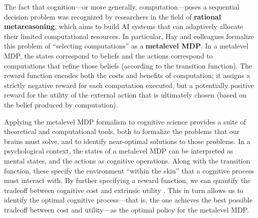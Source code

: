 The fact that cognition---or more generally, computation---poses a sequential decision problem was recognized by researchers in the field of \textbf{rational metareasoning}, which aims to build AI systems that can adaptively allocate their limited computational resources. In particular, Hay and colleagues \citealp{hay2012selecting,hay2016principles} formalize this problem of ``selecting computations'' as a \textbf{metalevel MDP}. In a metalevel MDP, the states correspond to beliefs and the actions correspond to computations that refine those beliefs (according to the transition function). The reward function encodes both the costs and benefits of computation; it assigns a strictly negative reward for each computation executed, but a potentially positive reward for the utility of the external action that is ultimately chosen (based on the belief produced by computation).

Applying the metalevel MDP formalism to cognitive science provides a suite of theoretical and computational tools, both to formalize the problems that our brains must solve, and to identify near-optimal solutions to those problems. In a psychological context, the states of a metalevel MDP can be interpreted as mental states, and the actions as cognitive operations. Along with the transition function, these specify the environment ``within the skin'' that a cognitive process must interact with. By further specifying a reward function, we can quantify the tradeoff between cognitive cost and extrinsic utility . This in turn allows us to identify the optimal cognitive process---that is, the one achieves the best possible tradeoff between cost and utility---as the optimal policy for the metalevel MDP.